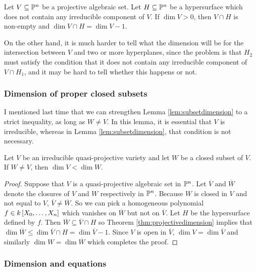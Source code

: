 \begin{theorem}
\label{thm:projectivedimension}
Let $ V \subseteq \mathbb{P}^n $ be a projective algebraic set. Let $ H \subseteq \mathbb{P}^n $ be a hypersurface which does not contain any irreducible component of $ V $. If $ \dim V > 0 $, then $ V \cap H $ is non-empty and $ \dim V \cap H = \dim V - 1 $.
\end{theorem}

On the other hand, it is much harder to tell what the dimension will be for the intersection between $ V $ and two or more hyperplanes, since the problem is that $ H_2 $ must satisfy the condition that it does not contain any irreducible component of $ V \cap H_1 $, and it may be hard to tell whether this happens or not.

\subsubsection{Dimension of proper closed subsets}

I mentioned last time that we can strengthen Lemma \ref{lem:subsetdimension} to a strict inequality, as long as $ W \ne V $. In this lemma, it is essential that $ V $ is irreducible, whereas in Lemma \ref{lem:subsetdimension}, that condition is not necessary.

\begin{lemma}
\label{lem:properdimension}
Let $ V $ be an irreducible quasi-projective variety and let $ W $ be a closed subset of $ V $. If $ W \ne V $, then $ \dim V < \dim W $.
\end{lemma}

\begin{proof}
Suppose that $ V $ is a quasi-projective algebraic set in $ \mathbb{P}^n $. Let $ \overline{V} $ and $ \overline{W} $ denote the closures of $ V $ and $ W $ respectively in $ \mathbb{P}^n $. Because $ W $ is closed in $ V $ and not equal to $ V $, $ \overline{V} \ne \overline{W} $. So we can pick a homogeneous polynomial $ f \in k\sbr{X_0, \dots, X_n} $ which vanishes on $ \overline{W} $ but not on $ \overline{V} $. Let $ H $ be the hypersurface defined by $ f $. Then $ \overline{W} \subseteq \overline{V} \cap H $ so Theorem \ref{thm:projectivedimension} implies that $ \dim \overline{W} \le \dim \overline{V} \cap H = \dim \overline{V} - 1 $. Since $ V $ is open in $ \overline{V} $, $ \dim V = \dim \overline{V} $ and similarly $ \dim W = \dim \overline{W} $ which completes the proof.
\end{proof}

\subsubsection{Dimension and equations}

